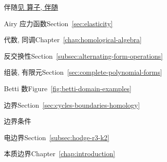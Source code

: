 \renewcommand{\indexname}{索引}
\begin{theindex}\label{back:index}


\item {}\label{index:adjoint}{伴随}\quad \hyperref[index:operator-adjoint]{{见 算子, 伴随}}

\item {}\label{index:airy-stress-function}{Airy 应力函数}\quad Section~\ref{sec:elasticity}

\item {}\label{index:algebra-homological}{代数, 同调}\quad Chapter~\ref{chap:homological-algebra}

\item {}\label{index:anticommutativity}{反交换性}\quad Section~\ref{subsec:alternating-form-operations}

\item {}\label{index:assembly-finite-element}{组装, 有限元}\quad Section~\ref{sec:complete-polynomial-forms}

\item {}\label{index:betti-number}{Betti 数}\quad Figure~\ref{fig:betti-domain-examples}

\item {}\label{index:boundary}{边界}\quad Section~\ref{sec:cycles-boundaries-homology}

\item {}\label{index:boundary-conditions}{边界条件}

\subitem {}\label{index:boundary-conditions-electric}{电边界}\quad Section~\ref{subsec:hodge-r3-k2}

\subitem {}\label{index:boundary-conditions-essential}{本质边界}\quad Chapter~\ref{chap:introduction}


\end{theindex}

